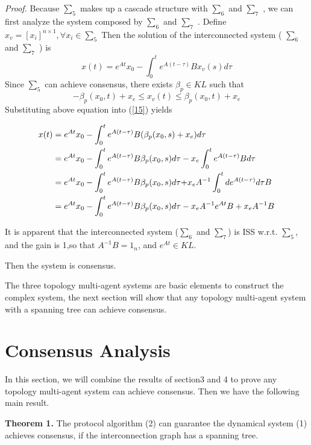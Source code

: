 \documentclass[english]{cccconf}
\begin{document}
{{\emph{Proof.} Because  $\sum_5$ makes up a cascade structure with   $\sum_6$ and $\sum_7$  ,  we can first analyze the system composed by   $\sum_6$ and $\sum_7$  . Define $x_v = [x_i]^{n\times 1},\forall x_i \in \sum_5$  Then
the solution of the interconnected system ( $\sum_6$ and $\sum_7$ ) is
\begin{equation} \label{15}
x(t) = {e^{At}}{x_0} - \int_0^t {{e^{A(t - \tau )}}B{x_{v}}(s)d\tau }
\end{equation}
Since $\sum_5$ can achieve consensus, there exists ${\beta _p} \in KL$ such that
\[ - {\beta _p}({x_0},t) + {x_e} \le {x_{v}}(t) \le {\beta _p}({x_0},t) + {x_e}\]
Substituting above equation into (\ref{15}) yields

\begin{align}
x(t)& = {e^{At}}{x_0} - \int_0^t {{e^{A(t - \tau )}}B({\beta _p}({x_0},s) + {x_e})d\tau } \nonumber \\
 &= {e^{At}}{x_0} - \int_0^t {{e^{A(t - \tau )}}B{\beta _p}({x_0},s)d\tau }  - {x_e}\int_0^t {{e^{A(t - \tau )}}Bd\tau }\nonumber\\
 &= {e^{At}}{x_0} - \int_0^t {{e^{A(t - \tau )}}B{\beta _p}({x_0},s)d\tau } {\rm{ + }}{x_e}{A^{ - 1}}\int_0^t {d{e^{A(t - \tau )}}d\tau } B\nonumber\\
 &= {e^{At}}{x_0} - \int_0^t {{e^{A(t - \tau )}}B{\beta _p}({x_0},s)d\tau }  - {x_e}{A^{ - 1}}{e^{At}}B + {x_e}{A^{ - 1}}B\nonumber
\end{align}

It is apparent that the interconnected system ($\sum_6$ and $\sum_7$) is ISS w.r.t. $\sum_5$, and the gain is 1,so that ${A^{ - 1}}B = {1_n}$, and ${e^{At}} \in KL$.


Then the system is consensus.

The three topology multi-agent systems are basic elements to construct the complex system, the next section will show that any topology multi-agent system with a spanning tree can achieve consensus.

\section{Consensus Analysis}

In this section, we will combine the results of section3 and 4 to prove any topology multi-agent system can achieve consensus.  Then we have the following main result.

{\textbf{Theorem 1. }} The protocol algorithm (2) can guarantee the dynamical system (1) achieves consensus, if the interconnection graph has a spanning tree.

}}
\end{document}
